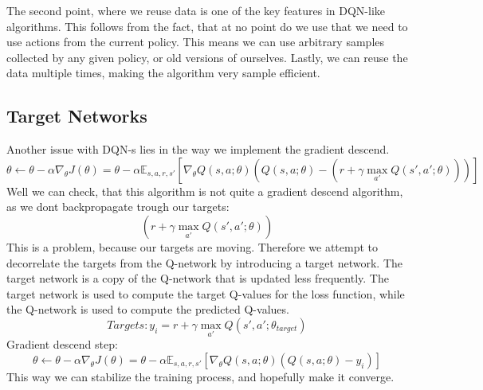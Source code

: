 \documentclass[a4paper,12pt]{article}
\begin{document}
The second point, where we reuse data is one of the key features in DQN-like algorithms. This follows from the fact, that at no point do we use that we need to use actions from the current policy. This means we can use arbitrary samples collected by any given policy, or old versions of ourselves. Lastly, we can reuse the data multiple times, making the algorithm very sample efficient.
\subsection{Target Networks}
Another issue with DQN-s lies in the way we implement the gradient descend.
\[
\theta \leftarrow \theta - \alpha \nabla_\theta J(\theta)= \theta - \alpha \mathbb{E}_{s, a, r, s'} \left[ \nabla_\theta Q(s, a; \theta)\left( Q(s, a; \theta) - (r + \gamma \max_{a'} Q(s', a'; \theta)) \right)  \right]
\]
Well we can check, that this algorithm is not quite a gradient descend algorithm, as we dont backpropagate trough our targets:
\[
(r + \gamma \max_{a'} Q(s', a'; \theta))
\]
This is a problem, because our targets are moving. Therefore we attempt to decorrelate the targets from the Q-network by introducing a target network. 
The target network is a copy of the Q-network that is updated less frequently. The target network is used to compute the target Q-values for the loss function, while the Q-network is used to compute the predicted Q-values.
\[
Targets: y_i = r + \gamma \max_{a'} Q(s', a'; \theta_{target})
\]
Gradient descend step:
\[
\theta \leftarrow \theta - \alpha \nabla_\theta J(\theta)= \theta - \alpha \mathbb{E}_{s, a, r, s'} \left[ \nabla_\theta Q(s, a; \theta)\left( Q(s, a; \theta) - y_i \right)  \right]
\]
This way we can stabilize the training process, and hopefully make it converge.
\end{document}
